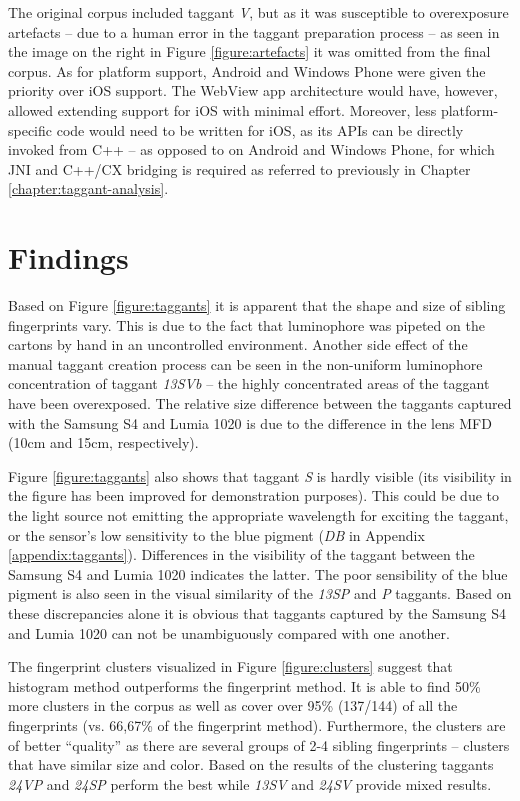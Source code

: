\documentclass[thesis.tex]{subfiles}
\begin{document}
The original corpus included taggant \emph{V}, but as it was susceptible to overexposure artefacts -- due to a human error in the taggant preparation process -- as seen in the image on the right in Figure \ref{figure:artefacts} it was omitted from the final corpus. As for platform support, Android and Windows Phone were given the priority over iOS support. The WebView app architecture would have, however, allowed extending support for iOS with minimal effort. Moreover, less platform-specific code would need to be written for iOS, as its APIs can be directly invoked from C++ -- as opposed to on Android and Windows Phone, for which JNI and C++/CX bridging is required as referred to previously in Chapter \ref{chapter:taggant-analysis}.

\section{Findings}
\label{chapter:findings}

Based on Figure \ref{figure:taggants} it is apparent that the shape and size of sibling fingerprints vary. This is due to the fact that luminophore was pipeted on the cartons by hand in an uncontrolled environment. Another side effect of the manual taggant creation process can be seen in the non-uniform luminophore concentration of taggant \emph{13SVb} -- the highly concentrated areas of the taggant have been overexposed. The relative size difference between the taggants captured with the Samsung S4 and Lumia 1020 is due to the difference in the lens MFD (10cm and 15cm, respectively).

Figure \ref{figure:taggants} also shows that taggant \emph{S} is hardly visible (its visibility in the figure has been improved for demonstration purposes). This could be due to the light source not emitting the appropriate wavelength for exciting the taggant, or the sensor's low sensitivity to the blue pigment (\emph{DB} in Appendix \ref{appendix:taggants}). Differences in the visibility of the taggant between the Samsung S4 and Lumia 1020 indicates the latter. The poor sensibility of the blue pigment is also seen in the visual similarity of the \emph{13SP} and \emph{P} taggants. Based on these discrepancies alone it is obvious that taggants captured by the Samsung S4 and Lumia 1020 can not be unambiguously compared with one another.

The fingerprint clusters visualized in Figure \ref{figure:clusters} suggest that histogram method outperforms the fingerprint method. It is able to find 50\% more clusters in the corpus as well as cover over 95\% (137/144) of all the fingerprints (vs. 66,67\% of the fingerprint method). Furthermore, the clusters are of better ``quality'' as there are several groups of 2-4 sibling fingerprints -- clusters that have similar size and color. Based on the results of the clustering taggants \emph{24VP} and \emph{24SP} perform the best while \emph{13SV} and \emph{24SV} provide mixed results.
\end{document}
